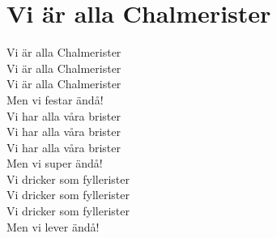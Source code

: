 \section{Vi är alla Chalmerister}
Vi är alla Chalmerister\\
Vi är alla Chalmerister\\
Vi är alla Chalmerister\\
Men vi festar ändå!\\

Vi har alla våra brister\\
Vi har alla våra brister\\
Vi har alla våra brister\\
Men vi super ändå!\\

Vi dricker som fyllerister\\
Vi dricker som fyllerister\\
Vi dricker som fyllerister\\
Men vi lever ändå!\\